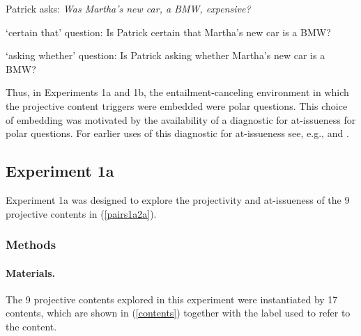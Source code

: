 \documentclass[11pt,fleqn]{article}
\newcommand{\6}{\mbox{$[\hspace*{-.6mm}[$}}
\newcommand{\9}{\mbox{$]\hspace*{-.6mm}]$}}
\begin{document}
\begin{exe}

\ex\label{stim} Patrick asks: {\em Was Martha's new car, a BMW, expensive?} 

\begin{xlist}
\ex `certain that' question: Is Patrick certain that Martha's new car is a BMW?

\ex `asking whether' question: Is Patrick asking whether Martha's new car is a BMW?

\end{xlist}

\end{exe}
Thus, in Experiments 1a and 1b, the entailment-canceling environment in which the projective content triggers were embedded were polar questions. This choice of embedding was motivated by the availability of a diagnostic for at-issueness for polar questions. For earlier uses of this diagnostic for at-issueness see, e.g., \citealt[731]{amaral-etal07} and \citealt{tonhauser-sula6}.

\subsection{Experiment 1a} 

Experiment 1a was designed to explore the projectivity and at-issueness of the 9 projective contents in (\ref{pairs1a2a}).

\subsubsection{Methods}\label{s-methods-1a}

\paragraph{Materials.} The 9 projective contents explored in this experiment were instantiated by 17 contents, which are shown in (\ref{contents}) together with the label used to refer to the content.
\end{document}
